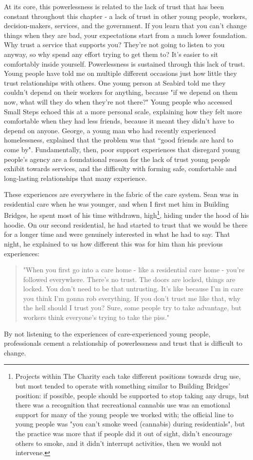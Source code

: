 At its core, this powerlessness is related to the lack of trust that has been constant throughout this chapter - a lack of trust in other young people, workers, decision-makers, services, and the government. If you learn that you can't change things when they are bad, your expectations start from a much lower foundation. Why trust a service that supports you? They're not going to listen to you anyway, so why spend any effort trying to get them to? It's easier to sit comfortably inside yourself. Powerlessness is sustained through this lack of trust. Young people have told me on multiple different occasions just how little they trust relationships with others. One young person at Seabird told me they couldn't depend on their workers for anything, because "if we depend on them now, what will they do when they're not there?" Young people who accessed Small Steps echoed this at a more personal scale, explaining how they felt more comfortable when they had less friends, because it meant they didn't have to depend on anyone. George, a young man who had recently experienced homelessness, explained that the problem was that “good friends are hard to come by". Fundamentally, then, poor support experiences that disregard young people’s agency are a foundational reason for the lack of trust young people exhibit towards services, and the difficulty with forming safe, comfortable and long-lasting relationships that many experience. 

These experiences are everywhere in the fabric of the care system. Sean was in residential care when he was younger, and when I first met him in Building Bridges, he spent most of his time withdrawn, high\footnote{Projects within The Charity each take different positions towards drug use, but most tended to operate with something similar to Building Bridges’ position: if possible, people should be supported to stop taking any drugs, but there was a recognition that recreational cannabis use was an emotional support for many of the young people we worked with; the official line to young people was "you can’t smoke weed (cannabis) during residentials", but the practice was more that if people did it out of sight, didn’t encourage others to smoke, and it didn’t interrupt activities, then we would not intervene.},  hiding under the hood of his hoodie. On our second residential, he had started to trust that we would be there for a longer time and were genuinely interested in what he had to say. That night, he explained to us how different this was for him than his previous experiences:
\begin{quote}
"When you first go into a care home - like a residential care home - you're followed everywhere. There's no trust. The doors are locked, things are locked. You don't need to be that untrusting. It's like because I'm in care you think I'm gonna rob everything. If you don't trust me like that, why the hell should I trust you? Sure, some people try to take advantage, but workers think everyone's trying to take the piss."
\end{quote}
By not listening to the experiences of care-experienced young people, professionals cement a relationship of powerlessness and trust that is difficult to change.

